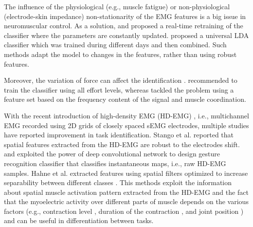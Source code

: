 The influence of the physiological (e.g., muscle fatigue) or non-physiological (electrode-skin impedance) non-stationarity of the EMG features is a big issue in neuromuscular control. As a solution, \citep{Vidovic2016} and \citep{Hahne2015} proposed a real-time retraining of the classifier where the parameters are constantly updated. \citet{Liu2016} proposed a universal LDA classifier which was trained during different days and then combined. Such methods adapt the model to changes in the features, rather than using robust features.

Moreover, the variation of force can affect the identification \citep{Tkach2010}. \citep{Scheme2013} recommended to train the classifier using all effort levels, whereas \citep{He2015} tackled the problem using a feature set based on the frequency content of the signal and muscle coordination.

With the recent introduction of high-density EMG (HD-EMG) \citep{Merletti2009}, i.e., multichannel EMG recorded using 2D grids of closely spaced sEMG electrodes, multiple studies have reported improvement in task identification. Stango et al. reported that spatial features extracted from the HD-EMG are robust to the electrodes shift. \citep{Geng2016} and \citep{Du2017} exploited the power of deep convolutional network to design gesture recognition classifier that classifies instantaneous maps, i.e., raw HD-EMG samples. Hahne et al. extracted features using spatial filters optimized to increase separability between different classes \citep{Hahne2012}. This methods exploit the information about spatial muscle activation pattern extracted from the HD-EMG and the fact that the myoelectric activity over different parts of muscle depends on the various factors (e.g., contraction level \citep{Holtermann2005}, duration of the contraction \citep{Tucker2009}, and joint position \citep{Vieira2010}) and can be useful in differentiation between tasks.

